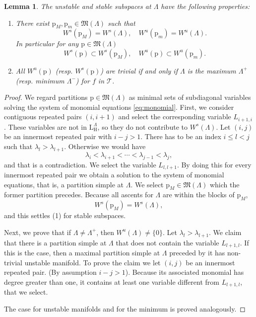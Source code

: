 \documentclass[reqno]{amsart}
\newcommand{\p}{\mathrm{p}}
\newcommand{\cT}{\mathcal{T}}
\renewcommand{\L}{\mathrm{L}}
\renewcommand{\H}{\mathrm{H}}
\newtheorem{lemma}[theorem]{Lemma}
\begin{document}
\begin{lemma}\label{lem:runs} The unstable and stable subspaces at $\Lambda$ have the following properties:
\begin{enumerate}
\item  There exist $\p_M,\p_m\in \mathfrak{M}(\Lambda)$ such that
 \begin{equation}\label{eq:max-unstable}W^s(\p_M)=W^s(\Lambda), \quad W^u(\p_m)=W^u(\Lambda).
  \end{equation}
 In particular for  any $\p\in \mathfrak{M}(\Lambda)$
 \begin{equation}\label{eq:stable-inclusion}
 W^s(\p)\subset W^s(\p_M),\quad W^u(\p)\subset W^u(\p_m).
 \end{equation}
\item  All $W^u(\p)$ (resp. $W^s(\p)$) are trivial if and only if $\Lambda$ is the maximum $\Lambda^+$
(resp. minimum $\Lambda^-$) for $f$ in $\cT$.
 \end{enumerate}

 \end{lemma}
\begin{proof}
 We regard partitions $\p\in \mathfrak{M}(\Lambda)$ as minimal sets of subdiagonal variables solving the system of monomial equations \eqref{eq:monomial}.
 First, we consider contiguous repeated pairs $(i,i+1)$ and select the corresponding variable $L_{i+1,i}$. These variables are not in $\L^\Lambda_\H$, so they do not contribute to $W^s(\Lambda)$. Let $(i,j)$ be an innermost repeated pair with $i-j>1$. There has to be an index $i\leq l< j$ such that $\lambda_l>\lambda_{l+1}$. Otherwise we would have
 \[\lambda_i<\lambda_{i+1}<\cdots <\lambda_{j-1}<\lambda_j,\]
 and that is a contradiction. We select the variable $L_{l,l+1}$. By doing  this for every innermost repeated pair we obtain a solution to the system of monomial equations, that is, a partition simple at $\Lambda$. We select $\p_M\in \mathfrak{M}(\Lambda)$ which the former partition precedes. Because all ascents for $\Lambda$ are within the blocks of $\p_M$,
 \[W^s(\p_M)=W^s(\Lambda),\]
 and this settles (1) for stable subspaces.

Next, we prove that if $\Lambda\neq \Lambda^+$,
then $W^u(\Lambda)\neq \{0\}$. Let $\lambda_l>\lambda_{l+1}$. We claim that there is a partition simple at $\Lambda$ that does not contain the variable $L_{l+1,l}$. If this is the case, then a maximal partition simple at $\Lambda$ preceded by it has non-trivial unstable manifold. To prove the claim  we let $(i,j)$ be an innermost repeated pair. (By assumption $i-j>1$). Because its associated monomial has  degree greater than one, it contains at least one variable different from $L_{l+1,l}$, that we select.

The case for unstable manifolds and for the minimum is proved analogously.
\end{proof}
\end{document}
